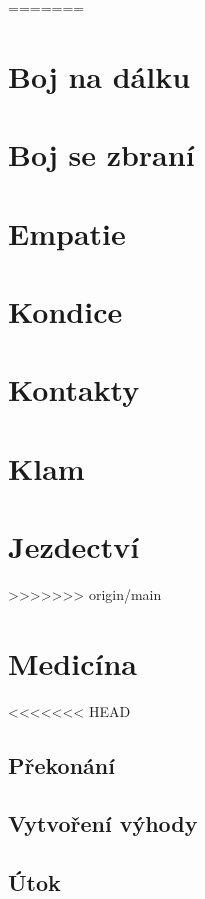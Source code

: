 \documentclass[../main.tex]{subfiles}
\begin{document}
=======
\section{Boj na dálku}
\label{sec:bojnadalku}

\section{Boj se zbraní}
\label{sec:bojsezbrani}

\section{Empatie}
\label{sec:empatie}

\section{Kondice}
\label{sec:kondice}

\section{Kontakty}
\label{sec:kontakty}

\section{Klam}
\label{sec:klam}

\section{Jezdectví}
\label{sec:jezdectvi}
>>>>>>> origin/main

\section{Medicína}
\label{sec:medicina}

<<<<<<< HEAD
\subsection*{Překonání}
\label{subsec:medicina-prekonani}
\prekonani

\subsection*{Vytvoření výhody}
\label{subsec:medicina-vytvoreni}
\vytvoreni

\subsection*{Útok}
\label{subsec:medicina-utok}
\utok
\end{document}
